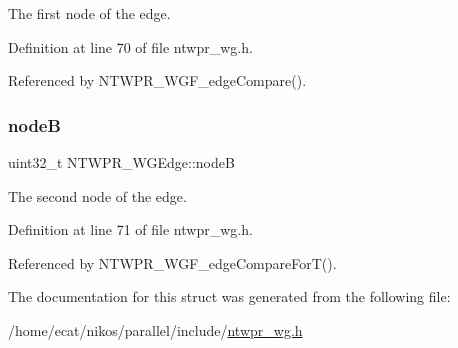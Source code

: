 The first node of the edge. 

Definition at line 70 of file ntwpr\+\_\+wg.\+h.



Referenced by N\+T\+W\+P\+R\+\_\+\+W\+G\+F\+\_\+edge\+Compare().

\mbox{\label{structNTWPR__WGEdge_a0f9b43039574824cc76908125ad3661d}} 
\subsubsection{\texorpdfstring{nodeB}{nodeB}}
{\footnotesize\ttfamily uint32\+\_\+t N\+T\+W\+P\+R\+\_\+\+W\+G\+Edge\+::nodeB}

The second node of the edge. 

Definition at line 71 of file ntwpr\+\_\+wg.\+h.



Referenced by N\+T\+W\+P\+R\+\_\+\+W\+G\+F\+\_\+edge\+Compare\+For\+T().



The documentation for this struct was generated from the following file\+:\begin{DoxyCompactItemize}
\item 
/home/ecat/nikos/parallel/include/\mbox{\hyperlink{ntwpr__wg_8h}{ntwpr\+\_\+wg.\+h}}\end{DoxyCompactItemize}
